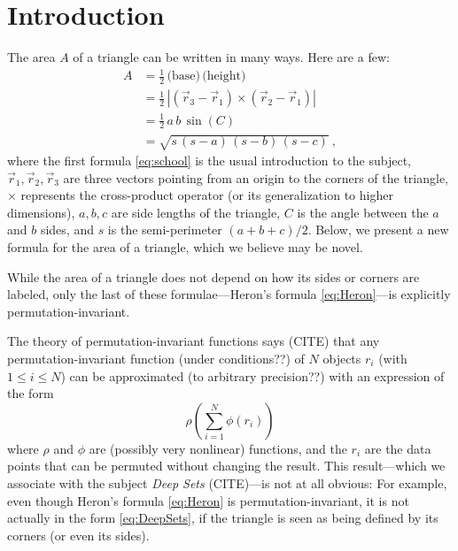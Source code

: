 \documentclass[12pt]{article}
\begin{document}
\section{Introduction}
The area $A$ of a triangle can be written in many ways.
Here are a few:
\begin{align}
A &= \frac{1}{2}\,\text{(base)}\,\text{(height)} \label{eq:school} \\
  &= \frac{1}{2}\,|(\vec{r}_3 - \vec{r}_1) \times (\vec{r}_2 - \vec{r}_1)| \label{eq:cross} \\
  &= \frac{1}{2}\,a\,b\,\sin(C) \label{eq:sine} \\
  &= \sqrt{s\,(s-a)\,(s-b)\,(s-c)} \label{eq:Heron} ~,
\end{align}
where the first formula \eqref{eq:school} is the usual introduction to the subject,
$\vec{r}_1, \vec{r}_2, \vec{r}_3$ are three vectors pointing from an origin to the corners of the triangle,
$\times$ represents the cross-product operator (or its generalization to higher dimensions),
$a, b, c$ are side lengths of the triangle,
$C$ is the angle between the $a$ and $b$ sides,
and $s$ is the semi-perimeter $(a + b + c)/2$.
Below, we present a new formula for the area of a triangle, which we believe may be novel.

While the area of a triangle does not depend on how its sides or corners are labeled,
only the last of these formulae---Heron's formula \eqref{eq:Heron}---is explicitly permutation-invariant.

The theory of permutation-invariant functions says (CITE) that any per\-mu\-tation-invariant function (under conditions??) of $N$ objects $r_i$ (with $1\leq i\leq N$) can be approximated (to arbitrary precision??) with an expression of the form
\begin{equation}
    \rho(\sum_{i=1}^N\phi(r_i)) \label{eq:DeepSets}
\end{equation}
where $\rho$ and $\phi$ are (possibly very nonlinear) functions,
and the $r_i$ are the data points that can be permuted without changing the result.
This result---which we associate with the subject \emph{Deep Sets} (CITE)---is not at all obvious:
For example, even though Heron's formula \eqref{eq:Heron} is permutation-invariant, it is not actually in the form \eqref{eq:DeepSets}, if the triangle is seen as being defined by its corners (or even its sides).
\end{document}
